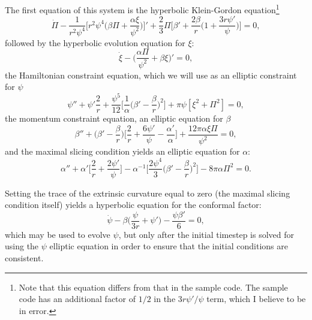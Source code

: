 \documentclass[12pt]{article}
\numberwithin{equation}{section}
\begin{document}
The first equation of this system is the hyperbolic Klein-Gordon equation\footnote{Note that this equation differs from that in the sample code.  The sample code has an additional factor of $1/2$ in the $3r\psi'/\psi$ term, which I believe to be in error.}
\begin{equation} \label{eq:hyperbolic_KGE}
\dot{\Pi} - \frac{1}{r^2 \psi^4} \Big[ r^2 \psi^4 \Big( \beta \Pi + \frac{\alpha \xi}{\psi^2} \Big)\Big]' + \frac{2}{3} \Pi \Big[ \beta' + \frac{2 \beta}{r} \Big(1 + \frac{3 r \psi'}{\psi} \Big) \Big] = 0,
\end{equation}
followed by the hyperbolic evolution equation for $\xi$:
\begin{equation} \label{eq:xi_evol}
\dot{\xi} - \Big( \frac{\alpha \Pi}{\psi^2} + \beta \xi \Big)' = 0,
\end{equation}
the Hamiltonian constraint equation, which we will use as an elliptic constraint for $\psi$
\begin{equation} \label{eq:psi_evol}
\psi'' + \psi' \frac{2}{r} + \frac{\psi^5}{12} \Big[ \frac{1}{\alpha} \Big( \beta' - \frac{\beta}{r} \Big)^2 \Big] + \pi \psi [\xi^2 + \Pi^2] = 0,
\end{equation}
the momentum constraint equation, an elliptic equation for $\beta$
\begin{equation} \label{eq:beta_evol}
\beta'' + \Big( \beta' - \frac{\beta}{r} \Big) \Big[ \frac{2}{r} + \frac{6 \psi'}{\psi} - \frac{\alpha'}{\alpha} \Big] + \frac{12 \pi \alpha \xi \Pi}{\psi^2} = 0,
\end{equation}
and the maximal slicing condition yields an elliptic equation for $\alpha$:
\begin{equation} \label{eq:alpha_evol}
\alpha'' + \alpha' \Big[ \frac{2}{r} + \frac{2 \psi'}{\psi} \Big] - \alpha^{-1} \Big[ \frac{2 \psi^4}{3} \Big( \beta' - \frac{\beta}{r} \Big)^2 \Big] - 8 \pi \alpha \Pi^2 = 0.
\end{equation}

Setting the trace of the extrinsic curvature equal to zero (the maximal slicing condition itself) yields a hyperbolic equation for the conformal factor:
\begin{equation} \label{eq:psi_hyperbolic_eqn}
\dot{\psi} - \beta \Big( \frac{\psi}{3 r} + \psi' \Big) - \frac{\psi \beta'}{6} = 0,
\end{equation}
which may be used to evolve $\psi$, but only after the initial timestep is solved for using the $\psi$ elliptic equation in order to ensure that the initial conditions are consistent.
\end{document}
